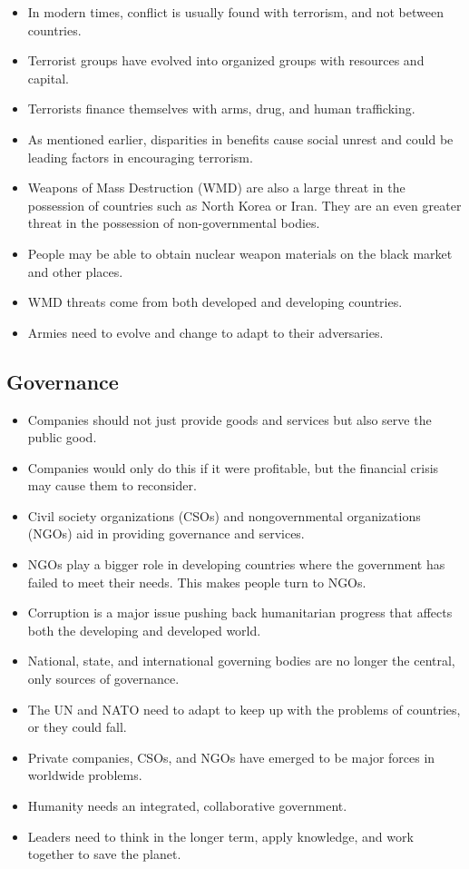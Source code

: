 \documentclass[11pt]{article}
\begin{document}
\begin{itemize}
\item In modern times, conflict is usually found with terrorism, and not between countries.
\item Terrorist groups have evolved into organized groups with resources and capital.
\item Terrorists finance themselves with arms, drug, and human trafficking.
\item As mentioned earlier, disparities in benefits cause social unrest and could be leading factors in encouraging terrorism.
\item Weapons of Mass Destruction (WMD) are also a large threat in the possession of countries such as North Korea or Iran. They are an even greater threat in the possession of non-governmental bodies.
\item People may be able to obtain nuclear weapon materials on the black market and other places.
\item WMD threats come from both developed and developing countries.
\item Armies need to evolve and change to adapt to their adversaries.
\end{itemize}
\subsection{Governance}
\label{sec:org1a58d00}

\begin{itemize}
\item Companies should not just provide goods and services but also serve the public good.
\item Companies would only do this if it were profitable, but the financial crisis may cause them to reconsider.
\item Civil society organizations (CSOs) and nongovernmental organizations (NGOs) aid in providing governance and services.
\item NGOs play a bigger role in developing countries where the government has failed to meet their needs. This makes people turn to NGOs.
\item Corruption is a major issue pushing back humanitarian progress that affects both the developing and developed world.
\item National, state, and international governing bodies are no longer the central, only sources of governance.
\item The UN and NATO need to adapt to keep up with the problems of countries, or they could fall.
\item Private companies, CSOs, and NGOs have emerged to be major forces in worldwide problems.
\item Humanity needs an integrated, collaborative government.
\item Leaders need to think in the longer term, apply knowledge, and work together to save the planet.
\end{itemize}
\end{document}
